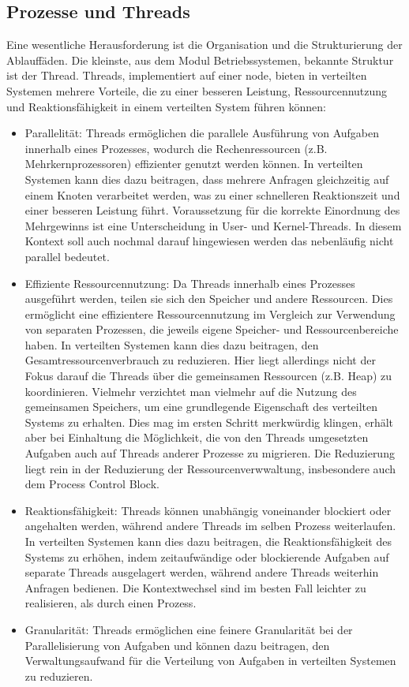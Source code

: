 \documentclass[../vs-script-first-v01.tex]{subfiles}
\begin{document}
\subsection{Prozesse und Threads}
Eine wesentliche Herausforderung ist die Organisation und die Strukturierung der Ablauffäden. Die kleinste, aus dem Modul Betriebssystemen, bekannte Struktur ist der Thread. Threads, implementiert auf einer node, bieten in verteilten Systemen mehrere Vorteile, die zu einer besseren Leistung, Ressourcennutzung und Reaktionsfähigkeit in einem verteilten System führen können:
\begin{itemize}
\item Parallelität: Threads ermöglichen die parallele Ausführung von Aufgaben innerhalb eines Prozesses, wodurch die Rechenressourcen (z.B. Mehrkernprozessoren) effizienter genutzt werden können. In verteilten Systemen kann dies dazu beitragen, dass mehrere Anfragen gleichzeitig auf einem Knoten verarbeitet werden, was zu einer schnelleren Reaktionszeit und einer besseren Leistung führt. Voraussetzung für die korrekte Einordnung des Mehrgewinns ist eine Unterscheidung in User- und Kernel-Threads. In diesem Kontext soll auch nochmal darauf hingewiesen werden das nebenläufig nicht parallel bedeutet. 
\item Effiziente Ressourcennutzung: Da Threads innerhalb eines Prozesses ausgeführt werden, teilen sie sich den Speicher und andere Ressourcen. Dies ermöglicht eine effizientere Ressourcennutzung im Vergleich zur Verwendung von separaten Prozessen, die jeweils eigene Speicher- und Ressourcenbereiche haben. In verteilten Systemen kann dies dazu beitragen, den Gesamtressourcenverbrauch zu reduzieren. Hier liegt allerdings nicht der Fokus darauf die Threads über die gemeinsamen Ressourcen (z.B. Heap) zu koordinieren. Vielmehr verzichtet man vielmehr auf die Nutzung des gemeinsamen Speichers, um eine grundlegende Eigenschaft des verteilten Systems zu erhalten. Dies mag  im ersten Schritt merkwürdig klingen, erhält aber bei Einhaltung die Möglichkeit, die von den Threads umgesetzten Aufgaben auch auf Threads anderer Prozesse zu migrieren. Die Reduzierung liegt rein in der Reduzierung der Ressourcenverwwaltung, insbesondere auch dem Process Control Block.  

\item Reaktionsfähigkeit: Threads können unabhängig voneinander blockiert oder angehalten werden, während andere Threads im selben Prozess weiterlaufen. In verteilten Systemen kann dies dazu beitragen, die Reaktionsfähigkeit des Systems zu erhöhen, indem zeitaufwändige oder blockierende Aufgaben auf separate Threads ausgelagert werden, während andere Threads weiterhin Anfragen bedienen. Die Kontextwechsel sind im besten Fall leichter zu realisieren, als durch einen Prozess.

\item Granularität: Threads ermöglichen eine feinere Granularität bei der Parallelisierung von Aufgaben und können dazu beitragen, den Verwaltungsaufwand für die Verteilung von Aufgaben in verteilten Systemen zu reduzieren.
\end{itemize}
\end{document}
